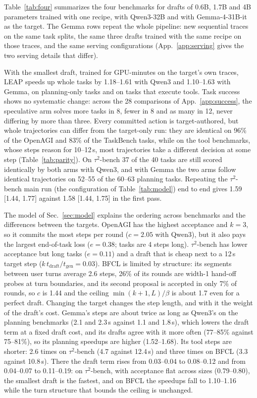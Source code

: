 Table~\ref{tab:four} summarizes the four benchmarks for drafts of 0.6B, 1.7B and 4B parameters
trained with one recipe, with Qwen3-32B and with Gemma-4-31B-it as the target. The Gemma rows repeat the
whole pipeline: new sequential traces on the same task splits, the same three drafts trained with the same
recipe on those traces, and the same serving configurations (App.~\ref{app:serving} gives the two serving
details that differ).

With the smallest draft, trained for GPU-minutes on the target's own traces, LEAP speeds up whole tasks by
1.18--1.61\xx{} with Qwen3 and 1.10--1.63\xx{} with Gemma, on planning-only tasks and on tasks that execute
tools. Task success shows no systematic change: across the 28 comparisons of App.~\ref{app:success}, the
speculative arm solves more tasks in 8, fewer in 8 and as many in 12, never differing by more than three.
Every committed action is target-authored, but whole trajectories can differ from the target-only run: they
are identical on 96\% of the OpenAGI and 83\% of the TaskBench tasks, while on the tool benchmarks, whose
steps reason for 10--12\,s, most trajectories take a different decision at some step (Table~\ref{tab:parity}).
On $\tau^2$-bench 37 of the 40 tasks are still scored identically by both arms with Qwen3, and with Gemma the
two arms follow identical trajectories on 52--55 of the 60--63 planning tasks. Repeating the $\tau^2$-bench main run (the
configuration of Table~\ref{tab:model}) end to end gives 1.59\xx{} [1.44, 1.77] against 1.58\xx{}
[1.44, 1.75] in the first pass.

The model of Sec.~\ref{sec:model} explains the ordering across benchmarks and the differences between the
targets. OpenAGI has the highest acceptance and $k{=}3$, so it commits the most steps per round
($c{=}2.05$ with Qwen3), but it also pays the largest end-of-task loss ($e{=}0.38$; tasks are 4 steps
long). $\tau^2$-bench has lower acceptance but long tasks ($e{=}0.11$) and a draft that is cheap next to a
12\,s target step ($k\,t_{\mathrm{draft}}/t_{\mathrm{gen}} = 0.03$). BFCL is limited by structure: its
segments between user turns average 2.6 steps, 26\% of its rounds are width-1 hand-off probes at turn
boundaries, and its second proposal is accepted in only 7\% of rounds, so $c$ is 1.44 and the ceiling
$\min(k{+}1, L)/\beta$ is about 1.7\xx{} even for a perfect draft. Changing the target changes the step
length, and with it the weight of the draft's cost. Gemma's steps are about twice as long as Qwen3's on the
planning benchmarks (2.1 and 2.3\,s against 1.1 and 1.8\,s), which lowers the draft term at a fixed draft
cost, and its drafts agree with it more often (77--85\% against 75--81\%), so its planning speedups are
higher (1.52--1.68\xx{}). Its tool steps are shorter: 2.6 times on $\tau^2$-bench (4.7 against 12.4\,s) and
three times on BFCL (3.3 against 10.8\,s). There the draft term rises from 0.03--0.04 to 0.08--0.12 and
from 0.04--0.07 to 0.11--0.19: on $\tau^2$-bench, with acceptance flat across sizes (0.79--0.80), the
smallest draft is the fastest, and on BFCL the speedups fall to 1.10--1.16\xx{} while the turn structure
that bounds the ceiling is unchanged.

